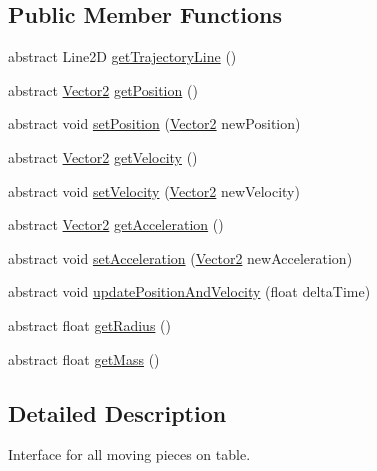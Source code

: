 \subsection*{Public Member Functions}
\begin{DoxyCompactItemize}
\item 
abstract Line2\+D \hyperlink{interfaceairhockeyjava_1_1physical_1_1_i_moving_item_a8235222d2382ee15212f27879a065167}{get\+Trajectory\+Line} ()
\item 
abstract \hyperlink{classairhockeyjava_1_1util_1_1_vector2}{Vector2} \hyperlink{interfaceairhockeyjava_1_1physical_1_1_i_moving_item_a02f85b807878f05076c70f6055e98704}{get\+Position} ()
\item 
abstract void \hyperlink{interfaceairhockeyjava_1_1physical_1_1_i_moving_item_a3d2397b443f7a389a062e34f4fb83907}{set\+Position} (\hyperlink{classairhockeyjava_1_1util_1_1_vector2}{Vector2} new\+Position)
\item 
abstract \hyperlink{classairhockeyjava_1_1util_1_1_vector2}{Vector2} \hyperlink{interfaceairhockeyjava_1_1physical_1_1_i_moving_item_a676e8ec1b6bea8fe54558e2f49f7add6}{get\+Velocity} ()
\item 
abstract void \hyperlink{interfaceairhockeyjava_1_1physical_1_1_i_moving_item_af8b757b68e2ad7237544d29eab28bb3a}{set\+Velocity} (\hyperlink{classairhockeyjava_1_1util_1_1_vector2}{Vector2} new\+Velocity)
\item 
abstract \hyperlink{classairhockeyjava_1_1util_1_1_vector2}{Vector2} \hyperlink{interfaceairhockeyjava_1_1physical_1_1_i_moving_item_acb1459eeec100ea4a6a2a2b18bcd3eec}{get\+Acceleration} ()
\item 
abstract void \hyperlink{interfaceairhockeyjava_1_1physical_1_1_i_moving_item_a3233173fbb68ea7948328dc355740e96}{set\+Acceleration} (\hyperlink{classairhockeyjava_1_1util_1_1_vector2}{Vector2} new\+Acceleration)
\item 
abstract void \hyperlink{interfaceairhockeyjava_1_1physical_1_1_i_moving_item_a6b73630eb20d349944040ff07338e8c1}{update\+Position\+And\+Velocity} (float delta\+Time)
\item 
abstract float \hyperlink{interfaceairhockeyjava_1_1physical_1_1_i_moving_item_a10eef2e6bcb81b381f43bd25a3b0d9d6}{get\+Radius} ()
\item 
abstract float \hyperlink{interfaceairhockeyjava_1_1physical_1_1_i_moving_item_a48fb412d7a8eb252601274d3b78ca75c}{get\+Mass} ()
\end{DoxyCompactItemize}


\subsection{Detailed Description}
Interface for all moving pieces on table.

